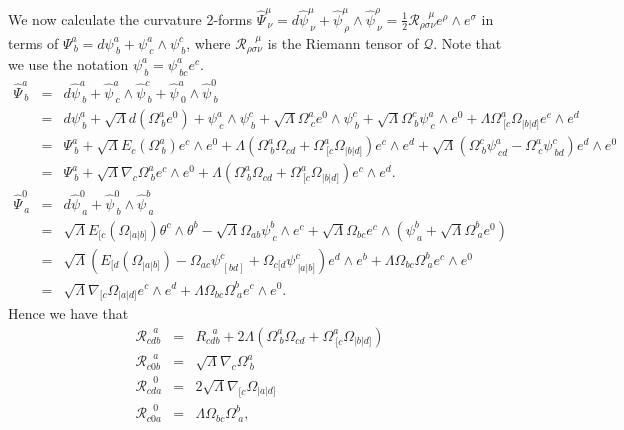 We now calculate the curvature 2-forms $\hat{\Psi}_{\ \nu}^{\mu}={d}\hat{\psi}_{\ \nu}^{\mu}+\hat{\psi}_{\ \rho}^{\mu}\wedge\hat{\psi}_{\ \nu}^{\rho}=\frac{1}{2}\mathcal{R}_{\rho\sigma\nu}^{\ \ \ \ \mu}e^{\rho}\wedge e^{\sigma}$
in terms of $\Psi_{\ b}^{a}={d}\psi_{\ b}^{a}+\psi_{\ c}^{a}\wedge\psi_{\ b}^{c}$,
where $\mathcal{R}_{\rho\sigma\nu}^{\ \ \ \ \mu}$ is the Riemann
tensor of $\mathcal{Q}$. Note that we use the notation $\psi_{\ b}^{a}=\psi_{\ bc}^{a}e^{c}$. 
\begin{eqnarray*}
\hat{\Psi}_{\ b}^{a} & = & {d}\hat{\psi}_{\ b}^{a}+\hat{\psi}_{\ c}^{a}\wedge\hat{\psi}_{\ b}^{c}+\hat{\psi}_{\ 0}^{a}\wedge\hat{\psi}_{\ b}^{0}\\
 & = & {d}\psi_{\ b}^{a}+{\sqrt{\Lambda}{d}}(\Omega_{\ b}^{a}e^{0})+\psi_{\ c}^{a}\wedge\psi_{\ b}^{c}+\sqrt{\Lambda}\Omega_{\ c}^{a}e^{0}\wedge\psi_{\ b}^{c}+\sqrt{\Lambda}\Omega_{\ b}^{c}\psi_{\ c}^{a}\wedge e^{0}+\Lambda\Omega_{\ [c}^{a}\Omega_{|b|d]}e^{c}\wedge e^{d}\\
 & = & \Psi_{\ b}^{a}+\sqrt{\Lambda}E_{c}(\Omega_{\ b}^{a})e^{c}\wedge e^{0}+\Lambda(\Omega_{\ b}^{a}\Omega_{cd}+\Omega_{\ [c}^{a}\Omega_{|b|d]})e^{c}\wedge e^{d}+\sqrt{\Lambda}(\Omega_{\ b}^{c}\psi_{\ cd}^{a}-\Omega_{\ c}^{a}\psi_{\ bd}^{c})e^{d}\wedge e^{0}\\
 & = & \Psi_{\ b}^{a}+\sqrt{\Lambda}\nabla_{c}\Omega_{\ b}^{a}e^{c}\wedge e^{0}+\Lambda(\Omega_{\ b}^{a}\Omega_{cd}+\Omega_{\ [c}^{a}\Omega_{|b|d]})e^{c}\wedge e^{d}.\\
\hat{\Psi}_{\ a}^{0} & = & {d}\hat{\psi}_{\ a}^{0}+\hat{\psi}_{\ b}^{0}\wedge\hat{\psi}_{\ a}^{b}\\
 & = & \sqrt{\Lambda}E_{[c}(\Omega_{|a|b]})\theta^{c}\wedge\theta^{b}-\sqrt{\Lambda}\Omega_{ab}\psi_{\ c}^{b}\wedge e^{c}+\sqrt{\Lambda}\Omega_{bc}e^{c}\wedge(\psi_{\ a}^{b}+\sqrt{\Lambda}\Omega_{\ a}^{b}e^{0})\\
 & = & \sqrt{\Lambda}(E_{[d}(\Omega_{|a|b]})-\Omega_{ac}\psi_{\ [bd]}^{c}+\Omega_{c[d}\psi_{\ |a|b]}^{c})e^{d}\wedge e^{b}+\Lambda\Omega_{bc}\Omega_{\ a}^{b}e^{c}\wedge e^{0}\\
 & = & \sqrt{\Lambda}\nabla_{[c}\Omega_{|a|d]}e^{c}\wedge e^{d}+\Lambda\Omega_{bc}\Omega_{\ a}^{b}e^{c}\wedge e^{0}.
\end{eqnarray*}
Hence we have that
\begin{eqnarray*}
\mathcal{R}_{cdb}^{\ \ \ a} & = & R_{cdb}^{\ \ \ a}+2\Lambda(\Omega_{\ b}^{a}\Omega_{cd}+\Omega_{\ [c}^{a}\Omega_{|b|d]})\\
\mathcal{R}_{c0b}^{\ \ \ a} & = & \sqrt{\Lambda}\nabla_{c}\Omega_{\ b}^{a}\\
\mathcal{R}_{cda}^{\ \ \ 0} & = & 2\sqrt{\Lambda}\nabla_{[c}\Omega_{|a|d]}\\
\mathcal{R}_{c0a}^{\ \ \ 0} & = & \Lambda\Omega_{bc}\Omega_{\ a}^{b},
\end{eqnarray*}

